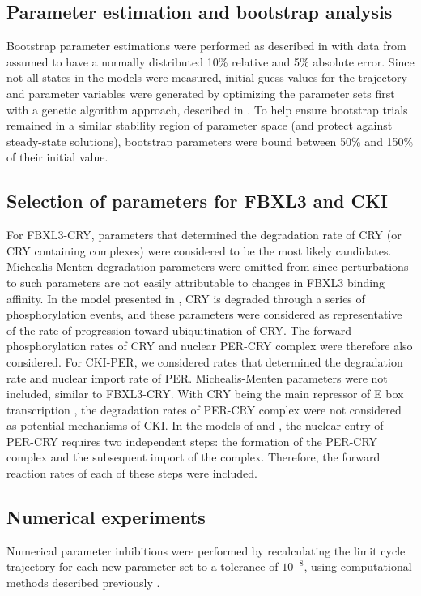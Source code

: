 \subsection{Parameter estimation and bootstrap analysis}
Bootstrap parameter estimations were performed as described in  with data from \cite{Lee2001} assumed to have a normally distributed 10\% relative and 5\% absolute error. 
Since not all states in the models were measured, initial guess values for the trajectory and parameter variables were generated by optimizing the parameter sets first with a genetic algorithm approach, described in \cite{Mirsky2009}. 
To help ensure bootstrap trials remained in a similar stability region of parameter space (and protect against steady-state solutions), bootstrap parameters were bound between 50\% and 150\% of their initial value. 

\subsection{Selection of parameters for FBXL3 and CKI}
For FBXL3-CRY, parameters that determined the degradation rate of CRY (or CRY containing complexes) were considered to be the most likely candidates. 
Michealis-Menten degradation parameters were omitted from  since perturbations to such parameters are not easily attributable to changes in FBXL3 binding affinity. 
In the model presented in \cite{Leloup2003}, CRY is degraded through a series of phosphorylation events, and these parameters were considered as representative of the rate of progression toward ubiquitination of CRY. 
The forward phosphorylation rates of CRY and nuclear PER-CRY complex were therefore also considered. 
 For CKI-PER, we considered rates that determined the degradation rate and nuclear import rate of PER. 
Michealis-Menten parameters were not included, similar to FBXL3-CRY. 
With CRY being the main repressor of E box transcription \cite{Ye2011}, the degradation rates of PER-CRY complex were not considered as potential mechanisms of CKI. 
In the models of \cite{Leloup2003} and \cite{Relogio2011}, the nuclear entry of PER-CRY requires two independent steps: the formation of the PER-CRY complex and the subsequent import of the complex. 
Therefore, the forward reaction rates of each of these steps were included. 

\subsection{Numerical experiments}
Numerical parameter inhibitions were performed by recalculating the limit cycle trajectory for each new parameter set to a tolerance of $10^{-8}$, using computational methods described previously \cite{Wilkins2009}.



